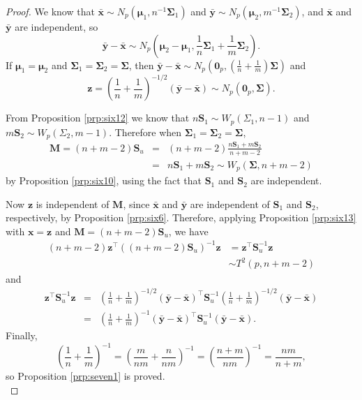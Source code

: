 \documentclass[]{book}
\theoremstyle{definition}
\theoremstyle{definition}
\theoremstyle{definition}
\theoremstyle{remark}
\begin{document}
\begin{proof}
{}We know that \(\bar{\mathbf x} \sim N_p \left({\boldsymbol{\mu}}_1,n^{-1}\boldsymbol{\Sigma}_1 \right)\) and \(\bar{\mathbf y} \sim N_p \left({\boldsymbol{\mu}}_2,m^{-1}\boldsymbol{\Sigma}_2 \right)\), and \(\bar{\mathbf x}\) and \(\bar{\mathbf y}\) are independent, so
\[\bar{\mathbf y} - \bar{\mathbf x} \sim N_p \left({\boldsymbol{\mu}}_2 - {\boldsymbol{\mu}}_1, \frac{1}{n}\boldsymbol{\Sigma}_1 + \frac{1}{m} \boldsymbol{\Sigma}_2 \right).\]
If \({\boldsymbol{\mu}}_1 = {\boldsymbol{\mu}}_2\) and \(\boldsymbol{\Sigma}_1 = \boldsymbol{\Sigma}_2 = \boldsymbol{\Sigma}\), then \(\bar{\mathbf y} - \bar{\mathbf x} \sim N_p \left(\boldsymbol 0_p, \left(\frac{1}{n} + \frac{1}{m} \right)\boldsymbol{\Sigma}\right)\) and
\[\mathbf z= \left(\frac{1}{n} + \frac{1}{m} \right)^{-1/2} (\bar{\mathbf y} - \bar{\mathbf x}) \sim N_p(\boldsymbol 0_p,\boldsymbol{\Sigma}).\]

From Proposition \ref{prp:six12} we know that \(n\mathbf S_1 \sim W_p(\Sigma_1,n-1)\) and \(m\mathbf S_2 \sim W_p(\Sigma_2,m-1)\). Therefore when \(\boldsymbol{\Sigma}_1 = \boldsymbol{\Sigma}_2 = \boldsymbol{\Sigma}\),
\begin{eqnarray*}
\mathbf M= (n+m-2)\mathbf S_u &=& (n+m-2)\frac{n\mathbf S_1 + m\mathbf S_2}{n+m-2} \\
&=& n\mathbf S_1 + m\mathbf S_2 \sim W_p(\boldsymbol{\Sigma},n+m-2)
\end{eqnarray*}
by Proposition \ref{prp:six10}, using the fact that \(\mathbf S_1\) and \(\mathbf S_2\) are independent.

Now \(\mathbf z\) is independent of \(\mathbf M\), since \(\bar{\mathbf x}\) and \(\bar{\mathbf y}\) are independent of \(\mathbf S_1\) and \(\mathbf S_2\), respectively, by Proposition \ref{prp:six6}. Therefore, applying Proposition \ref{prp:six13} with \(\mathbf x= \mathbf z\) and \(\mathbf M= (n+m-2)\mathbf S_u\), we have
\begin{align*}
(n+m-2) \mathbf z^\top ((n+m-2)\mathbf S_u)^{-1} \mathbf z&= \mathbf z^\top \mathbf S_u^{-1} \mathbf z\\
&\sim T^2(p,n+m-2)
\end{align*}
and
\begin{eqnarray*}
\mathbf z^\top \mathbf S_u^{-1} \mathbf z&=& \left(\frac{1}{n} + \frac{1}{m} \right)^{-1/2} (\bar{\mathbf y} - \bar{\mathbf x})^\top \mathbf S_u^{-1} \left(\frac{1}{n} + \frac{1}{m} \right)^{-1/2} (\bar{\mathbf y} - \bar{\mathbf x}) \\
&=& \left(\frac{1}{n} + \frac{1}{m} \right)^{-1} (\bar{\mathbf y} - \bar{\mathbf x})^\top \mathbf S_u^{-1} (\bar{\mathbf y} - \bar{\mathbf x}).
\end{eqnarray*}
Finally,
\[\left(\frac{1}{n} + \frac{1}{m} \right)^{-1} = \left(\frac{m}{nm} + \frac{n}{nm} \right)^{-1} = \left(\frac{n+m}{nm} \right)^{-1} = \frac{nm}{n+m},\]
so Proposition \ref{prp:seven1} is proved.\\
\end{proof}
\end{document}
